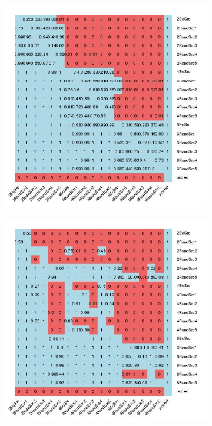 \documentclass[main]{subfiles}
\begin{document}
\begin{figure}[h]
\centering
\begin{subfigure}{.5\textwidth}
  \centering
  \includegraphics[width=\linewidth]{images/heatmapFotp}
\end{subfigure}%
\begin{subfigure}{.5\textwidth}
  \centering
  \includegraphics[width=\linewidth]{images/heatmapFotp_eff}

\end{subfigure}
\end{figure}
\end{document}

